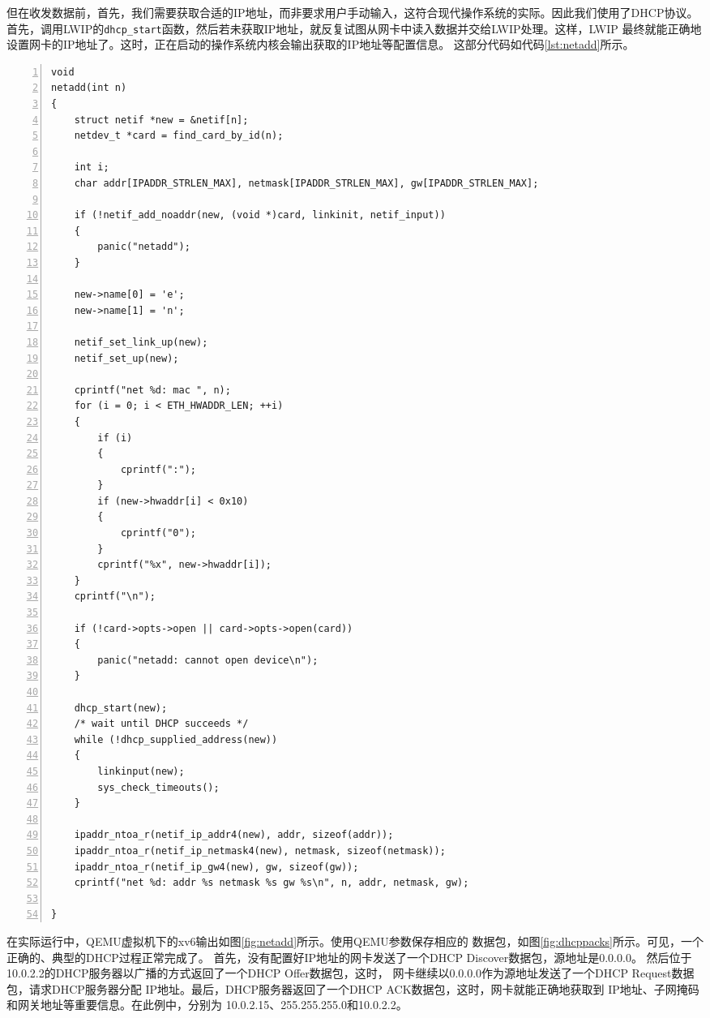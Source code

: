 \documentclass[a4paper,twoside]{ctexrep}
\begin{document}
\begin{spacing}{1.2}
但在收发数据前，首先，我们需要获取合适的IP地址，而非要求用户手动输入，这符合现代操作系统的实际。因此我们使用了DHCP协议。
首先，调用LWIP的\texttt{dhcp\_start}函数，然后若未获取IP地址，就反复试图从网卡中读入数据并交给LWIP处理。这样，LWIP
最终就能正确地设置网卡的IP地址了。这时，正在启动的操作系统内核会输出获取的IP地址等配置信息。
这部分代码如代码\ref{lst:netadd}所示。
\begin{lstlisting}[numbers=left,style=CppStyle,caption=网卡初始化,label={code:netadd}]
void
netadd(int n)
{
	struct netif *new = &netif[n];
	netdev_t *card = find_card_by_id(n);

	int i;
	char addr[IPADDR_STRLEN_MAX], netmask[IPADDR_STRLEN_MAX], gw[IPADDR_STRLEN_MAX];

	if (!netif_add_noaddr(new, (void *)card, linkinit, netif_input))
	{
		panic("netadd");
	}

	new->name[0] = 'e';
	new->name[1] = 'n';

	netif_set_link_up(new);
	netif_set_up(new);

	cprintf("net %d: mac ", n);
	for (i = 0; i < ETH_HWADDR_LEN; ++i)
	{
		if (i)
		{
			cprintf(":");
		}
		if (new->hwaddr[i] < 0x10)
		{
			cprintf("0");
		}
		cprintf("%x", new->hwaddr[i]);
	}
	cprintf("\n");

	if (!card->opts->open || card->opts->open(card))
	{
		panic("netadd: cannot open device\n");
	}

	dhcp_start(new);
	/* wait until DHCP succeeds */
	while (!dhcp_supplied_address(new))
	{
		linkinput(new);
		sys_check_timeouts();
	}

	ipaddr_ntoa_r(netif_ip_addr4(new), addr, sizeof(addr));
	ipaddr_ntoa_r(netif_ip_netmask4(new), netmask, sizeof(netmask));
	ipaddr_ntoa_r(netif_ip_gw4(new), gw, sizeof(gw));
	cprintf("net %d: addr %s netmask %s gw %s\n", n, addr, netmask, gw);

}
\end{lstlisting}

在实际运行中，QEMU虚拟机下的xv6输出如图\ref{fig:netadd}所示。使用QEMU参数保存相应的
数据包，如图\ref{fig:dhcppacks}所示。可见，一个正确的、典型的DHCP过程正常完成了。
首先，没有配置好IP地址的网卡发送了一个DHCP Discover数据包，源地址是0.0.0.0。
然后位于10.0.2.2的DHCP服务器以广播的方式返回了一个DHCP Offer数据包，这时，
网卡继续以0.0.0.0作为源地址发送了一个DHCP Request数据包，请求DHCP服务器分配
IP地址。最后，DHCP服务器返回了一个DHCP ACK数据包，这时，网卡就能正确地获取到
IP地址、子网掩码和网关地址等重要信息。在此例中，分别为
10.0.2.15、255.255.255.0和10.0.2.2。


\end{spacing}
\end{document}
